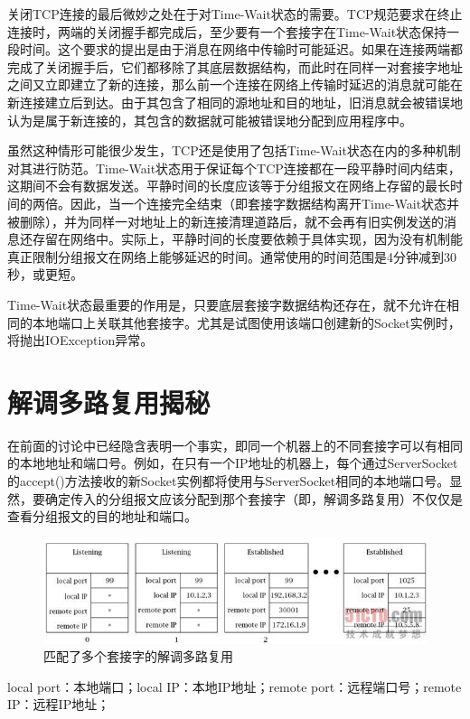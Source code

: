 		关闭TCP连接的最后微妙之处在于对Time-Wait状态的需要。TCP规范要求在终止连接时，两端的关闭握手都完成后，至少要有一个套接字在Time-Wait状态保持一段时间。这个要求的提出是由于消息在网络中传输时可能延迟。如果在连接两端都完成了关闭握手后，它们都移除了其底层数据结构，而此时在同样一对套接字地址之间又立即建立了新的连接，那么前一个连接在网络上传输时延迟的消息就可能在新连接建立后到达。由于其包含了相同的源地址和目的地址，旧消息就会被错误地认为是属于新连接的，其包含的数据就可能被错误地分配到应用程序中。

		虽然这种情形可能很少发生，TCP还是使用了包括Time-Wait状态在内的多种机制对其进行防范。Time-Wait状态用于保证每个TCP连接都在一段平静时间内结束，这期间不会有数据发送。平静时间的长度应该等于分组报文在网络上存留的最长时间的两倍。因此，当一个连接完全结束（即套接字数据结构离开Time-Wait状态并被删除），并为同样一对地址上的新连接清理道路后，就不会再有旧实例发送的消息还存留在网络中。实际上，平静时间的长度要依赖于具体实现，因为没有机制能真正限制分组报文在网络上能够延迟的时间。通常使用的时间范围是4分钟减到30秒，或更短。

		Time-Wait状态最重要的作用是，只要底层套接字数据结构还存在，就不允许在相同的本地端口上关联其他套接字。尤其是试图使用该端口创建新的Socket实例时，将抛出IOException异常。

\section{解调多路复用揭秘}

	在前面的讨论中已经隐含表明一个事实，即同一个机器上的不同套接字可以有相同的本地地址和端口号。例如，在只有一个IP地址的机器上，每个通过ServerSocket的accept()方法接收的新Socket实例都将使用与ServerSocket相同的本地端口号。显然，要确定传入的分组报文应该分配到那个套接字（即，解调多路复用）不仅仅是查看分组报文的目的地址和端口。

	\begin{figure}[htbp]%
		\centering
		\includegraphics[scale=.6]{img/06.12.jpg}
		\caption{匹配了多个套接字的解调多路复用}
		\label{fig:match.muti.socket.ru}
	\end{figure}

	local port：本地端口；local IP：本地IP地址；remote port：远程端口号；remote IP：远程IP地址；

